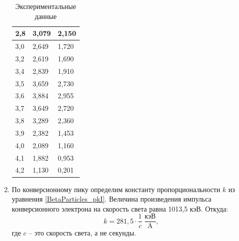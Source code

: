 \begin{enumerate}
\begin{table}[h!]
\begin{tabular}{|l|l|l|}
					2,8                          & 3,079                             & 2,150                                           \\ \hline
					3,0                          & 2,649                             & 1,720                                           \\ \hline
					3,2                          & 2,619                             & 1,690                                           \\ \hline
					3,4                          & 2,839                             & 1,910                                           \\ \hline
					3,5                          & 3,659                             & 2,730                                           \\ \hline
					3,6                          & 3,884                             & 2,955                                           \\ \hline
					3,7                          & 3,649                             & 2,720                                           \\ \hline
					3,8                          & 3,289                             & 2,360                                           \\ \hline
					3,9                          & 2,382                             & 1,453                                           \\ \hline
					4,0                          & 2,089                             & 1,160                                           \\ \hline
					4,1                          & 1,882                             & 0,953                                           \\ \hline
					4,2                          & 1,130                             & 0,201                                           \\ \hline
				\end{tabular}
			\caption{Экспериментальные данные}
			\label{BetaParticles_ExpTable}
		\end{table}
	
	
		\item По конверсионному пику определим константу пропорциональности $k$ из уравнения \eqref{BetaParticles_pkI}. Величина произведения импульса конверсионного электрона на скорость света равна 1013,5 кэВ. Откуда:
		\begin{equation*}
			k = 281,5 \cdot \frac{1}{c}\; \frac{\text{кэВ}}{\text{A}},
		\end{equation*}
	 	\noindent где $c$ -- это скорость света, а не секунды.
	 	

\end{enumerate}
